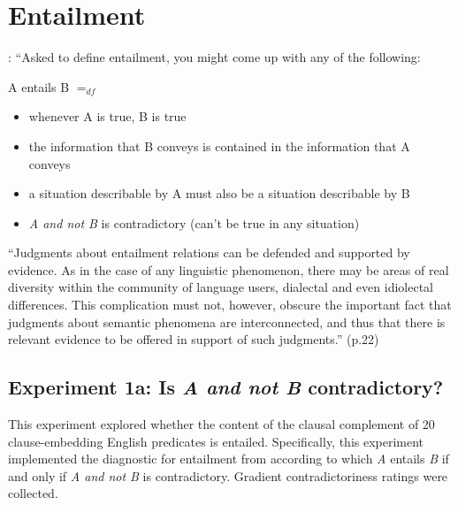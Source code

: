 \documentclass[11pt,fleqn]{article}
\newcommand{\6}{\mbox{$[\hspace*{-.6mm}[$}}
\newcommand{\9}{\mbox{$]\hspace*{-.6mm}]$}}
\begin{document}
\newpage

\section{Entailment}\label{s-entailment}

\citealt[19f.]{ccmg90}: ``Asked to define entailment, you might come up with any of the following:

\begin{exe}
\ex A entails B $=_{df}$

\begin{itemize}[leftmargin=5ex,topsep=0pt,itemsep=-2pt]

\item whenever A is true, B is true

\item the information that B conveys is contained in the information that A conveys

\item a situation describable by A must also be a situation describable by B

\item {\em A and not B} is contradictory (can't be true in any situation)

\end{itemize}
\end{exe}

``Judgments about entailment relations can be defended and supported by evidence. As in the case of any linguistic phenomenon, there may be areas of real diversity within the community of language users, dialectal and even idiolectal differences. This complication must not, however, obscure the important fact that judgments about semantic phenomena are interconnected, and thus that there is relevant evidence to be offered in support of such judgments.'' (p.22)

\subsection{Experiment 1a: Is {\em A and not B} contradictory?}

This experiment explored whether the content of the clausal complement of 20 clause-embedding English predicates is entailed. Specifically, this experiment implemented the diagnostic for entailment from \citealt{ccmg90} according to which {\em A} entails {\em B} if and only if {\em A and not B} is contradictory. Gradient contradictoriness ratings were collected.
\end{document}
